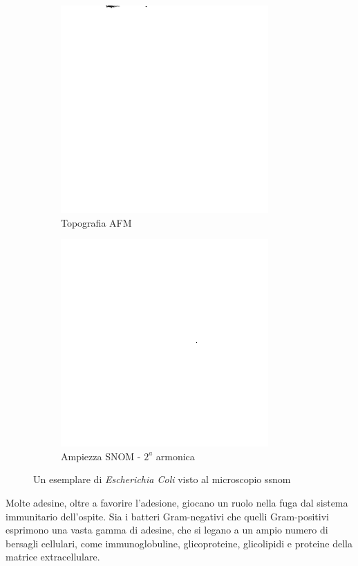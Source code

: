 \documentclass[../main.tex]{subfiles}
\begin{document}
\begin{figure}[h]
	\begin{subfigure}{0.5\linewidth}
		\centering
		\includegraphics[keepaspectratio, width=0.65\linewidth]{images/ecoli_afm.png}
		\caption{Topografia AFM}
	\end{subfigure}
	\begin{subfigure}{0.5\linewidth}
		\centering
		\includegraphics[keepaspectratio, width=0.65\linewidth]{images/ecoli_snom.png}
		\caption{Ampiezza SNOM - $2^{a}$ armonica}
	\end{subfigure}
	\caption[Un esemplare di \textit{Escherichia Coli} visto al microscopio s-SNOM]{
		Un esemplare di \textit{Escherichia Coli} visto al microscopio \acrshort{ssnom} \cite{ssnombacter_data}}
	\label{fig:ecoli}
\end{figure}

Molte adesine, oltre a favorire l’adesione, giocano un ruolo nella fuga dal sistema immunitario dell’ospite. Sia i batteri Gram-negativi che quelli Gram-positivi esprimono una vasta gamma di adesine, che si legano a un ampio numero di bersagli cellulari, come immunoglobuline, glicoproteine, glicolipidi e proteine della matrice extracellulare.\cite{finlay_1997}
\end{document}
